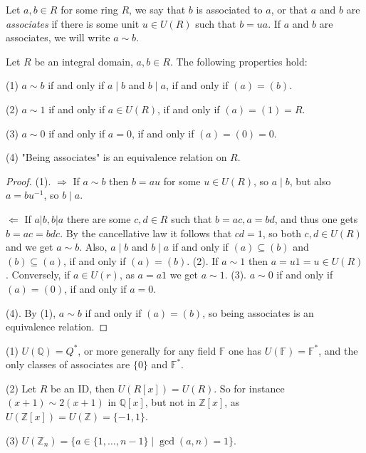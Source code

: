 \begin{definition}[Associates]
    Let $a, b \in R$ for some ring $R$, we say that $b$ is associated to $a$, or that $a$ and $b$ are {\it associates} if there is some unit $u \in U(R)$ such that $b=u a$. If $a$ and $b$ are associates, we will write $a \sim b$.
\end{definition} 

\begin{theorem}
     Let $R$ be an integral domain, $a, b \in R$. The following properties hold:

    (1) $a \sim b$ if and only if $a \mid b$ and $b \mid a$, if and only if $(a)=(b)$.
    
    (2) $a \sim 1$ if and only if $a \in U(R)$, if and only if $(a)=(1)=R$.
    
    (3) $a \sim 0$ if and only if $a=0$, if and only if $(a)=(0)=0$.
    
    (4) "Being associates" is an equivalence relation on $R$.
\end{theorem}
\begin{proof}
    (1). $\Rightarrow$ If $a \sim b$ then $b=a u$ for some $u \in U(R)$, so $a \mid b$, but also $a=b u^{-1}$, so $b \mid a$.

    $\Leftarrow$ If $a|b, b| a$ there are some $c, d \in R$ such that $b=a c, a=b d$, and thus one gets $b=a c=b d c$. By the cancellative law it follows that $c d=1$, so both $c, d \in U(R)$ and we get $a \sim b$. Also, $a \mid b$ and $b \mid a$ if and only if $(a) \subseteq(b)$ and $(b) \subseteq(a)$, if and only if $(a)=(b)$. (2). If $a \sim 1$ then $a=u 1=u \in U(R)$. Conversely, if $a \in U(r)$, as $a=a 1$ we get $a \sim 1$. (3). $a \sim 0$ if and only if $(a)=(0)$, if and only if $a=0$.
    
    (4). By (1), $a \sim b$ if and only if $(a)=(b)$, so being associates is an equivalence relation.
\end{proof}

\begin{example}
    (1) $U(\mathbb{Q})=Q^{*}$, or more generally for any field $\mathbb{F}$ one has $U(\mathbb{F})=\mathbb{F}^{*}$, and the only classes of associates are $\{0\}$ and $\mathbb{F}^{*}$.

    (2) Let $R$ be an ID, then $U(R[x])=U(R)$. So for instance $(x+1) \sim 2(x+1)$ in $\mathbb{Q}[x]$, but not in $\mathbb{Z}[x]$, as $U(\mathbb{Z}[x])=U(\mathbb{Z})=\{-1,1\}$.
    
    (3) $U\left(\mathbb{Z}_{n}\right)=\{a \in\{1, \ldots, n-1\} \mid \operatorname{gcd}(a, n)=1\}$.
\end{example}


